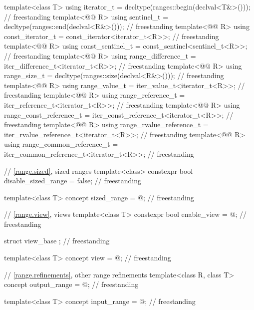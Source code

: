 \begin{codeblock}
{  template<class T>
    using iterator_t = decltype(ranges::begin(declval<T&>()));                      // freestanding
  template<@@ R>
    using sentinel_t = decltype(ranges::end(declval<R&>()));                        // freestanding
  template<@@ R>
    using const_iterator_t = const_iterator<iterator_t<R>>;                         // freestanding
  template<@@ R>
    using const_sentinel_t = const_sentinel<sentinel_t<R>>;                         // freestanding
  template<@@ R>
    using range_difference_t = iter_difference_t<iterator_t<R>>;                    // freestanding
  template<@@ R>
    using range_size_t = decltype(ranges::size(declval<R&>()));                     // freestanding
  template<@@ R>
    using range_value_t = iter_value_t<iterator_t<R>>;                              // freestanding
  template<@@ R>
    using range_reference_t = iter_reference_t<iterator_t<R>>;                      // freestanding
  template<@@ R>
    using range_const_reference_t = iter_const_reference_t<iterator_t<R>>;          // freestanding
  template<@@ R>
    using range_rvalue_reference_t = iter_rvalue_reference_t<iterator_t<R>>;        // freestanding
  template<@@ R>
    using range_common_reference_t = iter_common_reference_t<iterator_t<R>>;        // freestanding

  // \ref{range.sized}, sized ranges
  template<class>
    constexpr bool disable_sized_range = false;                                     // freestanding

  template<class T>
    concept sized_range = @\seebelow@;                                                // freestanding

  // \ref{range.view}, views
  template<class T>
    constexpr bool enable_view = @\seebelow@;                                         // freestanding

  struct view_base {};                                                              // freestanding

  template<class T>
    concept view = @\seebelow@;                                                       // freestanding

  // \ref{range.refinements}, other range refinements
  template<class R, class T>
    concept output_range = @\seebelow@;                                               // freestanding

  template<class T>
    concept input_range = @\seebelow@;                                                // freestanding

}
\end{codeblock}
